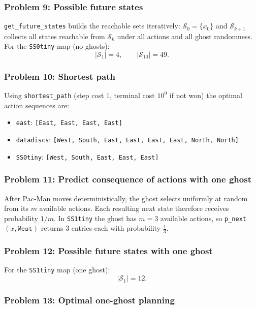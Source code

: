\documentclass[12pt]{article}
\begin{document}
\subsubsection*{{\color{red}Problem 9:  Possible future states}}

\texttt{get\_future\_states} builds the reachable sets iteratively: $\mathcal{S}_0 = \{x_0\}$ and $\mathcal{S}_{k+1}$ collects all states reachable from $\mathcal{S}_k$ under all actions and all ghost randomness. For the \texttt{SS0tiny} map (no ghosts):
$$|\mathcal{S}_1| = 4, \qquad |\mathcal{S}_{10}| = 49.$$

\subsubsection*{{\color{red}Problem 10:  Shortest path}}

Using \texttt{shortest\_path} (step cost 1, terminal cost $10^9$ if not won) the optimal action sequences are:
\begin{itemize}
	\item \texttt{east}: \texttt{[East, East, East, East]}
	\item \texttt{datadiscs}: \texttt{[West, South, East, East, East, East, North, North]}
	\item \texttt{SS0tiny}: \texttt{[West, South, East, East, East]}
\end{itemize}

\subsubsection*{{\color{red}Problem 11:  Predict consequence of actions with one ghost}}

After Pac-Man moves deterministically, the ghost selects uniformly at random from its $m$ available actions. Each resulting next state therefore receives probability $1/m$. In \texttt{SS1tiny} the ghost has $m=3$ available actions, so \texttt{p\_next}$(x, \texttt{West})$ returns 3 entries each with probability $\tfrac{1}{3}$.

\subsubsection*{{\color{red}Problem 12:  Possible future states with one ghost}}

For the \texttt{SS1tiny} map (one ghost):
$$|\mathcal{S}_1| = 12.$$

\subsubsection*{{\color{red}Problem 13:  Optimal one-ghost planning}}
\end{document}

